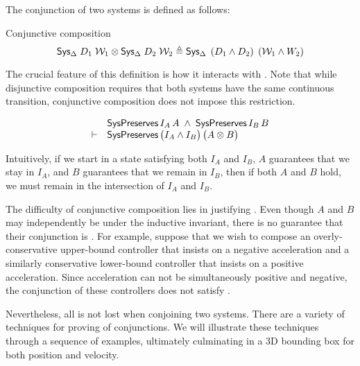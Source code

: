 The conjunction of two systems is defined as follows:
\begin{definition}{Conjunctive composition}
\[
{\textsf{Sys}}{}_{\Delta}\;D_1\;\mathcal{W}_1 \otimes {\textsf{Sys}}{}_{\Delta}\;D_2\;\mathcal{W}_2 \triangleq {\textsf{Sys}}{}_{\Delta}\;\left(D_1 \wedge D_2\right)\;\left(\mathcal{W}_1 \wedge W_2\right)
\]
\end{definition}
The crucial feature of this definition is how it interacts
with \SysPreserves.  Note that while disjunctive composition requires that
both systems have the same continuous transition, conjunctive composition
does not impose this restriction.
\begin{theorem}{}
\[\begin{array}{rl}
       & \mathsf{SysPreserves}\,I_A\,A \;\wedge\; \mathsf{SysPreserves}\,I_B\,B \\
\vdash & \mathsf{SysPreserves}\,\big(I_A \wedge I_B\big)\,\big(A \otimes B\big)
\end{array}
\]
\end{theorem}
Intuitively, if we start in a state satisfying both $I_A$ and $I_B$, $A$
guarantees that we stay in $I_A$, and $B$ guarantees that we remain in
$I_B$, then if both $A$ and $B$ hold, we must remain in the intersection of
$I_A$ and $I_B$.

The difficulty of conjunctive composition lies in justifying \progress{}.
Even though $A$ and $B$ may independently be \Enabled under the inductive
invariant, there is no guarantee that their conjunction is \Enabled.  For
example, suppose that we wish to compose an overly-conservative upper-bound
controller that insists on a negative acceleration and a similarly
conservative lower-bound controller that insists on a positive
acceleration.  Since acceleration can not be simultaneously positive and
negative, the conjunction of these controllers does not
satisfy \progress{}.

Nevertheless, all is not lost when conjoining two systems.  There are a
variety of techniques for proving \Enabledness of conjunctions.  We will
illustrate these techniques through a sequence of examples, ultimately
culminating in a 3D bounding box for both position and velocity.

